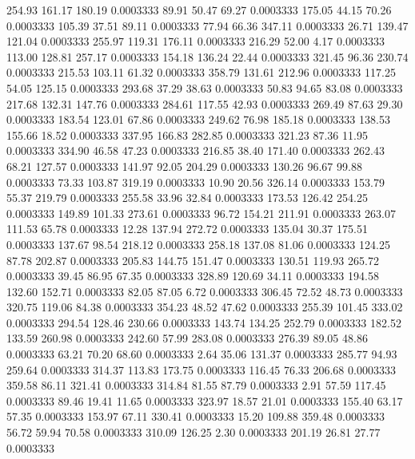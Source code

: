  254.93  161.17  180.19   0.0003333
  89.91   50.47   69.27   0.0003333
 175.05   44.15   70.26   0.0003333
 105.39   37.51   89.11   0.0003333
  77.94   66.36  347.11   0.0003333
  26.71  139.47  121.04   0.0003333
 255.97  119.31  176.11   0.0003333
 216.29   52.00    4.17   0.0003333
 113.00  128.81  257.17   0.0003333
 154.18  136.24   22.44   0.0003333
 321.45   96.36  230.74   0.0003333
 215.53  103.11   61.32   0.0003333
 358.79  131.61  212.96   0.0003333
 117.25   54.05  125.15   0.0003333
 293.68   37.29   38.63   0.0003333
  50.83   94.65   83.08   0.0003333
 217.68  132.31  147.76   0.0003333
 284.61  117.55   42.93   0.0003333
 269.49   87.63   29.30   0.0003333
 183.54  123.01   67.86   0.0003333
 249.62   76.98  185.18   0.0003333
 138.53  155.66   18.52   0.0003333
 337.95  166.83  282.85   0.0003333
 321.23   87.36   11.95   0.0003333
 334.90   46.58   47.23   0.0003333
 216.85   38.40  171.40   0.0003333
 262.43   68.21  127.57   0.0003333
 141.97   92.05  204.29   0.0003333
 130.26   96.67   99.88   0.0003333
  73.33  103.87  319.19   0.0003333
  10.90   20.56  326.14   0.0003333
 153.79   55.37  219.79   0.0003333
 255.58   33.96   32.84   0.0003333
 173.53  126.42  254.25   0.0003333
 149.89  101.33  273.61   0.0003333
  96.72  154.21  211.91   0.0003333
 263.07  111.53   65.78   0.0003333
  12.28  137.94  272.72   0.0003333
 135.04   30.37  175.51   0.0003333
 137.67   98.54  218.12   0.0003333
 258.18  137.08   81.06   0.0003333
 124.25   87.78  202.87   0.0003333
 205.83  144.75  151.47   0.0003333
 130.51  119.93  265.72   0.0003333
  39.45   86.95   67.35   0.0003333
 328.89  120.69   34.11   0.0003333
 194.58  132.60  152.71   0.0003333
  82.05   87.05    6.72   0.0003333
 306.45   72.52   48.73   0.0003333
 320.75  119.06   84.38   0.0003333
 354.23   48.52   47.62   0.0003333
 255.39  101.45  333.02   0.0003333
 294.54  128.46  230.66   0.0003333
 143.74  134.25  252.79   0.0003333
 182.52  133.59  260.98   0.0003333
 242.60   57.99  283.08   0.0003333
 276.39   89.05   48.86   0.0003333
  63.21   70.20   68.60   0.0003333
   2.64   35.06  131.37   0.0003333
 285.77   94.93  259.64   0.0003333
 314.37  113.83  173.75   0.0003333
 116.45   76.33  206.68   0.0003333
 359.58   86.11  321.41   0.0003333
 314.84   81.55   87.79   0.0003333
   2.91   57.59  117.45   0.0003333
  89.46   19.41   11.65   0.0003333
 323.97   18.57   21.01   0.0003333
 155.40   63.17   57.35   0.0003333
 153.97   67.11  330.41   0.0003333
  15.20  109.88  359.48   0.0003333
  56.72   59.94   70.58   0.0003333
 310.09  126.25    2.30   0.0003333
 201.19   26.81   27.77   0.0003333
